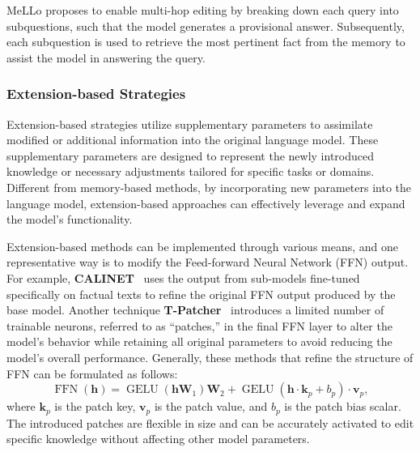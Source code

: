 \documentclass[acmsmall, screen]{acmart}
\newcommand{\bh}{\mathbf{h}}
\begin{document}
MeLLo proposes to enable multi-hop editing by breaking down each query into subquestions, such that the model generates a provisional answer. Subsequently, each subquestion is used to retrieve the most pertinent fact from the memory to assist the model in answering the query. 



\subsubsection{\textbf{Extension-based Strategies}}
Extension-based strategies utilize supplementary parameters to assimilate modified or additional information into the original language model. These supplementary parameters are designed to represent the newly introduced knowledge or necessary adjustments tailored for specific tasks or domains. Different from memory-based methods, by incorporating new parameters into the language model, extension-based approaches can effectively leverage and expand the model's functionality. %

Extension-based methods can be implemented through various means, and one representative way is to modify the Feed-forward Neural Network (FFN) output. For example, \textbf{CALINET}~\cite{CALINET} uses the output from sub-models fine-tuned specifically on factual texts to refine the original FFN output produced by the base model. %
Another technique \textbf{T-Patcher}~\cite{Transformer-Patcher} introduces a limited number of trainable neurons, referred to as ``patches,'' in the final FFN layer to alter the model's behavior while retaining all original parameters to avoid reducing the model's overall performance. Generally, these methods that refine the structure of FFN can be formulated as follows:
\begin{equation}
\operatorname{FFN}(\textbf{h}) =\operatorname{GELU}\left(\textbf{h} \mathbf{W}_1\right) \mathbf{W}_2+ \operatorname{GELU}\left(\bh \cdot \mathbf{k}_p +b_p\right)\cdot \mathbf{v}_p,
\end{equation}
where $\mathbf{k}_p$ is the patch key, $\mathbf{v}_p$ is the patch value, and $b_p$ is the patch bias scalar. The introduced patches are flexible in size and can be accurately activated to edit specific knowledge without affecting other model parameters.
\end{document}
